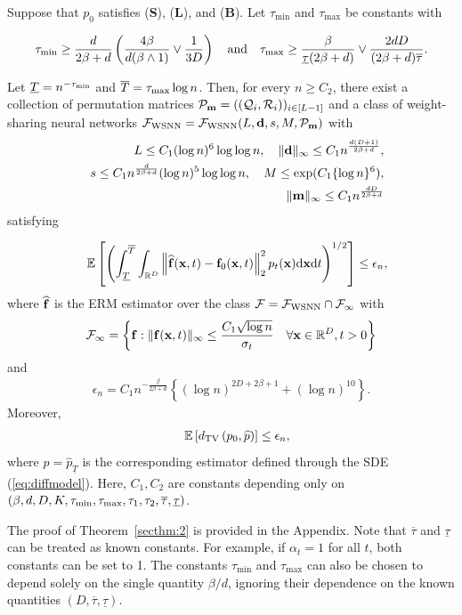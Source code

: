 \documentclass[twoside,11pt]{article}
\def\cF{\mathcal F}
\def\cP{\mathcal P}
\def\cQ{\mathcal Q}
\def\cR{\mathcal R}
\newcommand{\bB}{{\bf B}}
\newcommand{\bd}{{\bf d}}
\newcommand{\bff}{{\bf f}}
\newcommand{\bL}{{\bf L}}
\newcommand{\bfm}{{\bf m}}
\newcommand{\bS}{{\bf S}}
\newcommand{\bx}{{\bf x}}
\newcommand{\bbE}{{\mathbb E}}
\newcommand{\bbR}{{\mathbb R}}
\newcommand{\bean}{\setlength\arraycolsep{1pt}\begin{eqnarray*}}
\newcommand{\eean}{\end{eqnarray*}}
\def\d{{\rm d}}
\begin{document}
\begin{theorem} \label{secthm:2}
Suppose that $p_0$ satisfies (\bS), (\bL), and (\bB).
Let $\tau_{\min}$ and $\tau_{\max}$ be constants with

\bean
\tau_{\rm min} \geq \frac{d}{2\beta + d} \left( \frac{4\beta}{d (\beta \wedge 1)} \vee \frac{1}{3D} \right)
\quad \text{and}
\quad \tau_{\rm max} \geq \frac{\beta}{\underline{\tau}(2\beta+d)} \vee \frac{2dD}{(2\beta + d ) \overline{\tau}}.
\eean

Let $\underline{T} = n^{- \tau_{\rm min}}$ and $\overline{T} = \tau_{\rm max} \log n$.
Then, for every $n \geq C_{2}$, there exist a collection of permutation matrices $\cP_{\bfm} = ( ( \cQ_{i}, \cR_{i} ) )_{i \in [L-1] }$ and a class of weight-sharing neural networks $\cF_{\rm WSNN} = \cF_{\rm WSNN}(L,\bd,s,M,\cP_{\bfm})$ with
\bean
&& L \leq  C_{1} ( \log n )^{6} \log \log n , \quad \| \bd\|_{\infty} \leq  C_{1}  n^{\frac{d (D+1) }{2\beta + d}},
\\
&& s \leq  C_{1}  n^{\frac{d  }{2\beta + d}}  (\log n)^{5} \log \log n, \quad M \leq \exp(  C_{1}  \{ \log n \}^6 ),
\\ 
&& \| \bfm \|_{\infty} \leq  C_{1}  n^{\frac{dD}{2\beta + d}} 
\eean
satisfying 

\bean
&& \bbE \left[ \left( \int_{\underline{T}}^{\overline{T}} \int_{\bbR^{D}} \left\| \widehat \bff(\bx,t) - \bff_0(\bx, t)  \right\|_2^2 p_t(\bx) \d \bx \d t \right)^{1/2} \right]
 \leq \epsilon_n,
\eean
where $\widehat \bff$ is the ERM estimator over the class $\cF = \cF_{\rm WSNN} \cap \cF_{\infty}$ with
\bean
 \cF_\infty = \bigg\{ \bff: \| \bff(\bx,t) \|_{\infty} \leq \frac{C_{1} \sqrt{\log n}}{\sigma_t} \quad \forall \bx \in \bbR^{D}, t > 0 \bigg\}
\eean
and
\bean
\epsilon_n = C_{1} n^{-\frac{\beta }{2\beta + d}} \left\{ (\log n )^{ 2D + 2\beta + 1 } +  (\log n)^{10}  \right\}.
\eean
Moreover, 
\bean
 && \bbE \left[ d_{\rm TV} \left( p_{0}, \widehat p \right) \right]
 \leq \epsilon_n,
\eean
where $\widehat p = \widehat p_{\underline{T}}$ is the corresponding estimator defined through the SDE (\ref{eq:diffmodel}).
Here, $C_{1}, C_{2}$ are constants depending only on $(\beta,d,D,K, \tau_{\rm min}, \tau_{\rm max}, \tau_{1}, \tau_{2}, \overline{\tau}, \underline{\tau})$.

\end{theorem}

The proof of Theorem~\ref{secthm:2} is provided in the Appendix.
Note that $\overline{\tau}$ and $\underline{\tau}$ can be treated as known constants. For example, if $\alpha_t = 1$ for all $t$, both constants can be set to 1. The constants $\tau_{\min}$ and $\tau_{\max}$ can also be chosen to depend solely on the single quantity $\beta/d$, ignoring their dependence on the known quantities $(D, \overline{\tau}, \underline{\tau})$.
\end{document}
